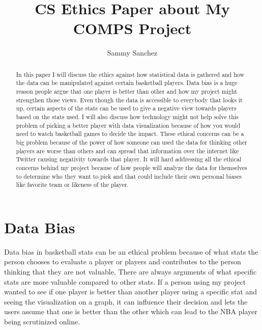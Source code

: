 \documentclass[10pt,twocolumn]{article}
\title{CS Ethics Paper about My COMPS Project}
\author{Sammy Sanchez}
\affiliation{Occidental College}
\begin{document}
\maketitle

\begin{abstract}

 In this paper I will discuss the ethics against how statistical data is gathered and how the data can be manipulated against certain basketball players. Data bias is a huge reason people argue that one player is better than other and how my project might strengthen those views. Even though the data is accessible to everybody that looks it up, certain aspects of the stats can be used to give a negative view towards players based on the stats used. I will also discuss how technology might not help solve this problem of picking a better player with data visualization because of how you would need to watch basketball games to decide the impact. These ethical concerns can be a big problem because of the power of how someone can used the data for thinking other players are worse than others and can spread that information over the internet like Twitter causing negativity towards that player. It will hard addressing all the ethical concerns behind my project because of how people will analyze the data for themselves to determine who they want to pick and that could include their own personal biases like favorite team or likeness of the player. 
    

\end{abstract}

\section{Data Bias}

Data bias in basketball stats can be an ethical problem because of what stats the person chooses to evaluate a player or players and contributes to the person thinking that they are not valuable. There are always arguments of what specific stats are more valuable compared to other stats. If a person using my project wanted to see if one player is better than another player using a specific stat and seeing the visualization on a graph, it can influence their decision and lets the users assume that one is better than the other which can lead to the NBA player being scrutinized online.  
\end{document}
